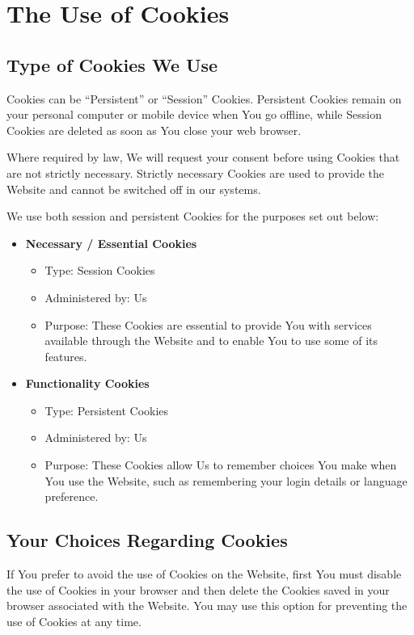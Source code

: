 \documentclass[11pt, a4paper]{report}
\begin{document}
\section*{The Use of Cookies}

\subsection*{Type of Cookies We Use}
Cookies can be ``Persistent'' or ``Session'' Cookies. Persistent Cookies remain on your personal computer or mobile device when You go offline, while Session Cookies are deleted as soon as You close your web browser.

Where required by law, We will request your consent before using Cookies that are not strictly necessary. Strictly necessary Cookies are used to provide the Website and cannot be switched off in our systems.

We use both session and persistent Cookies for the purposes set out below:

\begin{itemize}
	\item \textbf{Necessary / Essential Cookies}
	\begin{itemize}
		\item Type: Session Cookies
		\item Administered by: Us
		\item Purpose: These Cookies are essential to provide You with services available through the Website and to enable You to use some of its features.
	\end{itemize}
	\item \textbf{Functionality Cookies}
	\begin{itemize}
		\item Type: Persistent Cookies
		\item Administered by: Us
		\item Purpose: These Cookies allow Us to remember choices You make when You use the Website, such as remembering your login details or language preference.
	\end{itemize}
\end{itemize}

\subsection*{Your Choices Regarding Cookies}
If You prefer to avoid the use of Cookies on the Website, first You must disable the use of Cookies in your browser and then delete the Cookies saved in your browser associated with the Website. You may use this option for preventing the use of Cookies at any time.
\end{document}
